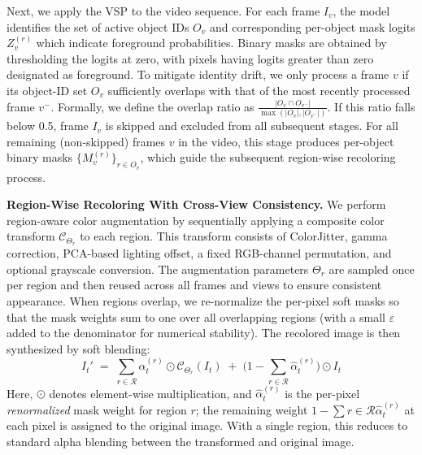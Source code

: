 Next, we apply the VSP to the video sequence. For each frame $I_{v}$, the model identifies the set of active object IDs $O_v$ and corresponding per-object mask logits $Z_v^{(r)}$ which indicate foreground probabilities. Binary masks are obtained by thresholding the logits at zero, with pixels having logits greater than zero designated as foreground.
To mitigate identity drift, we only process a frame $v$ if its object-ID set $O_v$ sufficiently overlaps with that of the most recently processed frame $v^-$. Formally, we define the overlap ratio as $\frac{|O_v \cap O_{v^-}|}{\max(|O_v|, |O_{v^-}|)}$. If this ratio falls below 0.5, frame $I_v$ is skipped and excluded from all subsequent stages.
For all remaining (non-skipped) frames $v$ in the video, this stage produces per-object binary masks $\{M_v^{(r)}\}_{r \in O_v}$, which guide the subsequent region-wise recoloring process.

\vspace{1mm}
\noindent\textbf{Region-Wise Recoloring With Cross-View Consistency.}
We perform region-aware color augmentation by sequentially applying a composite color transform $\mathcal{C}_{\Theta_r}$ to each region. This transform consists of ColorJitter, gamma correction, PCA-based lighting offset, a fixed RGB-channel permutation, and optional grayscale conversion. The augmentation parameters $\Theta_r$ are sampled once per region and then reused across all frames and views to ensure consistent appearance.
%
When regions overlap, we re-normalize the per-pixel soft masks so that the mask weights sum to one over all overlapping regions (with a small $\varepsilon$ added to the denominator for numerical stability). The recolored image is then synthesized by soft blending:
\begin{equation*}
I_t' \;=\; 
\sum_{r\in\mathcal{R}} \hat{\alpha}_t^{(r)} \odot \mathcal{C}_{\Theta_r}(I_t)
\;+\;
\Big(1 - \sum_{r\in\mathcal{R}} \hat{\alpha}_t^{(r)}\Big) \odot I_t
\end{equation*}
Here, \(\odot\) denotes element-wise multiplication, and \(\hat{\alpha}_t^{(r)}\) is the per-pixel \emph{renormalized} mask weight for region \(r\); the remaining weight $1 - \sum{r\in\mathcal{R}} \hat{\alpha}_t^{(r)}$ at each pixel is assigned to the original image.
With a single region, this reduces to standard alpha blending between the transformed and original image.

